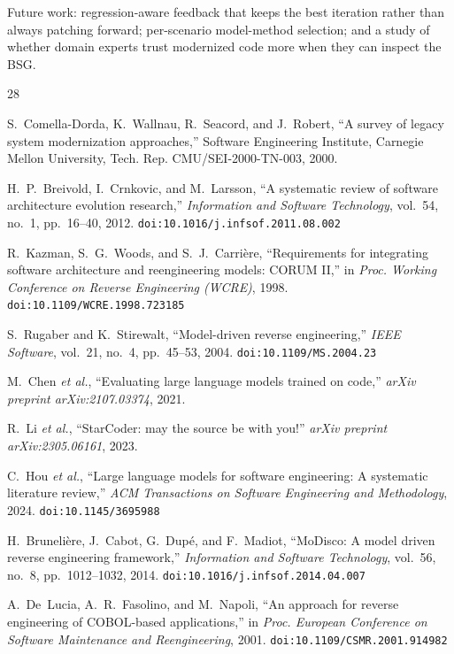 \documentclass[conference]{IEEEtran}
\begin{document}
Future work: regression-aware feedback that keeps the best iteration rather than always patching forward; per-scenario model-method selection; and a study of whether domain experts trust modernized code more when they can inspect the BSG.


\begin{thebibliography}{28}

S.~Comella-Dorda, K.~Wallnau, R.~Seacord, and J.~Robert, ``A survey of legacy system modernization approaches,'' Software Engineering Institute, Carnegie Mellon University, Tech. Rep. CMU/SEI-2000-TN-003, 2000.

H.~P.~Breivold, I.~Crnkovic, and M.~Larsson, ``A systematic review of software architecture evolution research,'' \textit{Information and Software Technology}, vol.~54, no.~1, pp.~16--40, 2012. \texttt{doi:10.1016/j.infsof.2011.08.002}

R.~Kazman, S.~G.~Woods, and S.~J.~Carri\`{e}re, ``Requirements for integrating software architecture and reengineering models: CORUM II,'' in \textit{Proc. Working Conference on Reverse Engineering (WCRE)}, 1998. \texttt{doi:10.1109/WCRE.1998.723185}

S.~Rugaber and K.~Stirewalt, ``Model-driven reverse engineering,'' \textit{IEEE Software}, vol.~21, no.~4, pp.~45--53, 2004. \texttt{doi:10.1109/MS.2004.23}

M.~Chen \textit{et al.}, ``Evaluating large language models trained on code,'' \textit{arXiv preprint arXiv:2107.03374}, 2021.

R.~Li \textit{et al.}, ``StarCoder: may the source be with you!'' \textit{arXiv preprint arXiv:2305.06161}, 2023.

C.~Hou \textit{et al.}, ``Large language models for software engineering: A systematic literature review,'' \textit{ACM Transactions on Software Engineering and Methodology}, 2024. \texttt{doi:10.1145/3695988}

H.~Bruneli\`{e}re, J.~Cabot, G.~Dup\'{e}, and F.~Madiot, ``MoDisco: A model driven reverse engineering framework,'' \textit{Information and Software Technology}, vol.~56, no.~8, pp.~1012--1032, 2014. \texttt{doi:10.1016/j.infsof.2014.04.007}

A.~De~Lucia, A.~R.~Fasolino, and M.~Napoli, ``An approach for reverse engineering of COBOL-based applications,'' in \textit{Proc. European Conference on Software Maintenance and Reengineering}, 2001. \texttt{doi:10.1109/CSMR.2001.914982}


\end{thebibliography}
\end{document}
